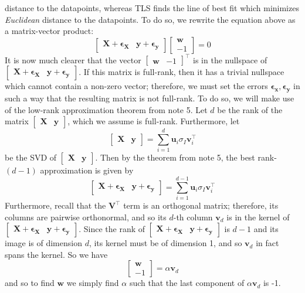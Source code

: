 \documentclass{article}
\begin{document}
distance to the datapoints, whereas TLS finds the line of best fit which minimizes \textit{Euclidean} distance to the datapoints. To do so, we rewrite the equation above as a matrix-vector product: $$\begin{bmatrix} \mathbf{X + \epsilon_X} & \mathbf{y + \epsilon_y}\end{bmatrix}\begin{bmatrix} \mathbf{w} \\ -1 \end{bmatrix} = 0$$ It is now much clearer that the vector $\begin{bmatrix} \mathbf{w} & -1 \end{bmatrix}^{\top}$ is in the nullspace of $\begin{bmatrix} \mathbf{X + \epsilon_X} & \mathbf{y + \epsilon_y}\end{bmatrix}$. If this matrix is full-rank, then it has a trivial nullspace which cannot contain a non-zero vector; therefore, we must set the errors $\mathbf{\epsilon_x, \epsilon_y}$ in such a way that the resulting matrix is not full-rank. To do so, we will make use of the low-rank approximation theorem from note 5. Let $d$ be the rank of the matrix $\begin{bmatrix} \mathbf{X} & \mathbf{y}\end{bmatrix}$, which we assume is full-rank. Furthermore, let $$\begin{bmatrix} \mathbf{X} & \mathbf{y}\end{bmatrix} = \sum\limits_{i=1}^d \mathbf{u}_i\sigma_I\mathbf{v}_i^{\top}$$ be the SVD of $\begin{bmatrix} \mathbf{X} & \mathbf{y}\end{bmatrix}$. Then by the theorem from note 5, the best rank-$(d-1)$ approximation is given by $$\begin{bmatrix} \mathbf{X + \epsilon_X} & \mathbf{y + \epsilon_y}\end{bmatrix} = \sum\limits_{i=1}^{d-1} \mathbf{u}_i\sigma_I\mathbf{v}_i^{\top}$$ Furthermore, recall that the $\mathbf{V}^{\top}$ term is an orthogonal matrix; therefore, its columns are pairwise orthonormal, and so its $d$-th column $\mathbf{v}_d$ is in the kernel of $\begin{bmatrix} \mathbf{X + \epsilon_X} & \mathbf{y + \epsilon_y}\end{bmatrix}$. Since the rank of $\begin{bmatrix} \mathbf{X + \epsilon_X} & \mathbf{y + \epsilon_y}\end{bmatrix}$ is $d - 1$ and its image is of dimension $d$, its kernel must be of dimension 1, and so $\mathbf{v}_d$ in fact spans the kernel. So we have $$\begin{bmatrix} \mathbf{w} \\ -1 \end{bmatrix} = \alpha \mathbf{v}_d$$ and so to find $\mathbf{w}$ we simply find $\alpha$ such that the last component of $\alpha\mathbf{v}_d$ is -1.
\end{document}
